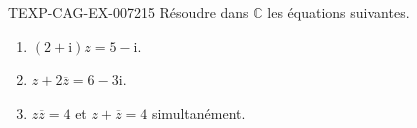 \begin{exercice}{TEXP-CAG-EX-007}{2}{15}
Résoudre dans $\mathbb{C}$ les équations suivantes.
\begin{enumerate}
  \item $(2+\mathrm{i})z=5-\mathrm{i}$.
  \item $z+2\overline{z}=6-3\mathrm{i}$.
  \item $z\overline{z}=4$ et $z+\overline{z}=4$ simultanément.
\end{enumerate}
\end{exercice}
